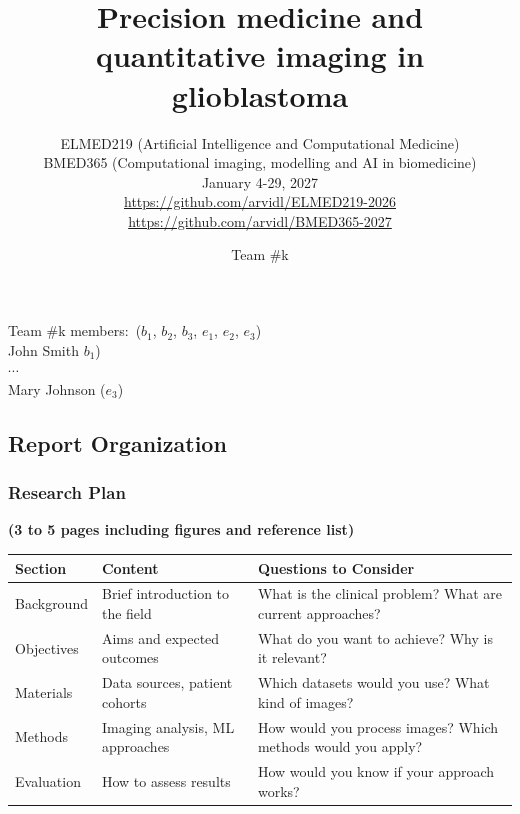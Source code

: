 \documentclass[11pt]{article}
\title{Precision medicine and quantitative imaging in glioblastoma}
\author{ELMED219 (Artificial Intelligence and Computational Medicine) \\
BMED365  (Computational imaging, modelling and AI in biomedicine) \\
January 4-29, 2027\\
{\footnotesize \url{https://github.com/arvidl/ELMED219-2026}} \\
{\footnotesize \url{https://github.com/arvidl/BMED365-2027}}}
\date{Team \#k}
\begin{document}
\maketitle


\noindent Team \#k members:\, ($b_1$, $b_2$, $b_3$, $e_1$, $e_2$, $e_3$) \\

\noindent John Smith $b_1$)\\
$\cdots$\\
 Mary Johnson ($e_3$)

\begin{scriptsize}
\subsection*{Report Organization}
\subsubsection*{Research Plan}
\textbf{(3 to 5 pages including figures and reference list)}
\begin{table}[htbp]
\centering
\scriptsize
\begin{tabular}{p{3cm}p{4.5cm}p{6.5cm}}
\toprule
\textbf{Section} & \textbf{Content} & \textbf{Questions to Consider} \\
\midrule
Background & Brief introduction to the field & What is the clinical problem? What are current approaches? \\
Objectives & Aims and expected outcomes & What do you want to achieve? Why is it relevant? \\
Materials & Data sources, patient cohorts & Which datasets would you use? What kind of images? \\
Methods & Imaging analysis, ML approaches & How would you process images? Which methods would you apply? \\
Evaluation & How to assess results & How would you know if your approach works? \\
\bottomrule
\end{tabular}
\end{table}

\end{scriptsize}
\end{document}
